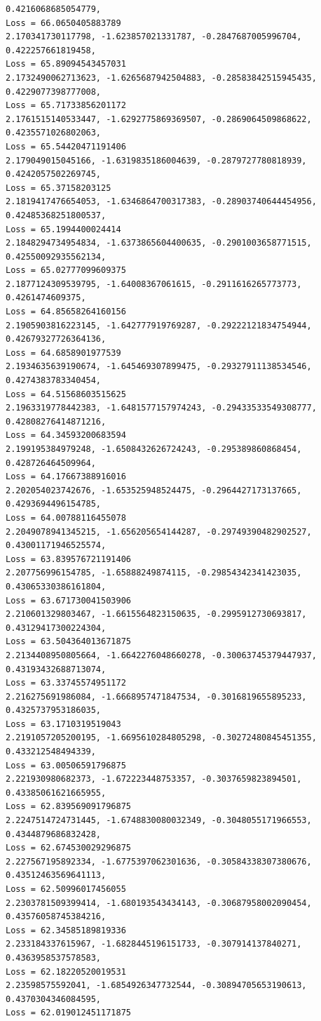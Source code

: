 \documentclass[11pt]{article}
\begin{document}
\begin{Verbatim}[commandchars=\\\{\}]
0.4216068685054779,
Loss = 66.0650405883789
2.170341730117798, -1.623857021331787, -0.2847687005996704, 0.422257661819458,
Loss = 65.89094543457031
2.1732490062713623, -1.6265687942504883, -0.28583842515945435,
0.4229077398777008,
Loss = 65.71733856201172
2.1761515140533447, -1.6292775869369507, -0.2869064509868622,
0.4235571026802063,
Loss = 65.54420471191406
2.179049015045166, -1.6319835186004639, -0.2879727780818939, 0.4242057502269745,
Loss = 65.37158203125
2.1819417476654053, -1.6346864700317383, -0.28903740644454956,
0.42485368251800537,
Loss = 65.1994400024414
2.1848294734954834, -1.6373865604400635, -0.2901003658771515,
0.42550092935562134,
Loss = 65.02777099609375
2.1877124309539795, -1.64008367061615, -0.2911616265773773, 0.4261474609375,
Loss = 64.85658264160156
2.1905903816223145, -1.642777919769287, -0.29222121834754944,
0.42679327726364136,
Loss = 64.6858901977539
2.1934635639190674, -1.645469307899475, -0.29327911138534546,
0.4274383783340454,
Loss = 64.51568603515625
2.1963319778442383, -1.6481577157974243, -0.29433533549308777,
0.42808276414871216,
Loss = 64.34593200683594
2.199195384979248, -1.6508432626724243, -0.295389860868454, 0.428726464509964,
Loss = 64.17667388916016
2.202054023742676, -1.653525948524475, -0.2964427173137665, 0.4293694496154785,
Loss = 64.00788116455078
2.2049078941345215, -1.656205654144287, -0.29749390482902527,
0.43001171946525574,
Loss = 63.839576721191406
2.207756996154785, -1.65888249874115, -0.29854342341423035, 0.43065330386161804,
Loss = 63.671730041503906
2.210601329803467, -1.6615564823150635, -0.2995912730693817,
0.43129417300224304,
Loss = 63.504364013671875
2.2134408950805664, -1.6642276048660278, -0.30063745379447937,
0.43193432688713074,
Loss = 63.33745574951172
2.216275691986084, -1.6668957471847534, -0.3016819655895233, 0.4325737953186035,
Loss = 63.1710319519043
2.2191057205200195, -1.6695610284805298, -0.30272480845451355,
0.433212548494339,
Loss = 63.00506591796875
2.221930980682373, -1.672223448753357, -0.3037659823894501, 0.43385061621665955,
Loss = 62.839569091796875
2.2247514724731445, -1.6748830080032349, -0.3048055171966553,
0.4344879686832428,
Loss = 62.674530029296875
2.227567195892334, -1.6775397062301636, -0.30584338307380676,
0.43512463569641113,
Loss = 62.50996017456055
2.2303781509399414, -1.680193543434143, -0.30687958002090454,
0.43576058745384216,
Loss = 62.34585189819336
2.233184337615967, -1.6828445196151733, -0.307914137840271, 0.4363958537578583,
Loss = 62.18220520019531
2.23598575592041, -1.6854926347732544, -0.30894705653190613, 0.4370304346084595,
Loss = 62.019012451171875

\end{Verbatim}
\end{document}
